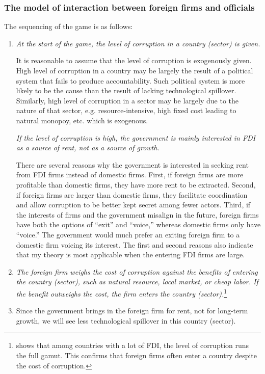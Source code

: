 \subsubsection{The model of interaction between foreign firms and officials}

The sequencing of the game is as follows:
\begin{enumerate}
\item \textit{At the start of the game, the level of corruption in a country (sector) is given.}

It is reasonable to assume that the level of corruption is exogenously given. High level of corruption in a country may be largely the result of a political system that fails to produce accountability. Such political system is more likely to be the cause than the result of lacking technological spillover. Similarly, high level of corruption in a sector may be largely due to the nature of that sector, e.g. resource-intensive, high fixed cost leading to natural monopoy, etc. which is exogenous.

\textit{If the level of corruption is high, the government is mainly interested in FDI as a source of rent, not as a source of growth.}

 There are several reasons why the government is interested in seeking rent from FDI firms instead of domestic firms. First, if foreign firms are more profitable than domestic firms, they have more rent to be extracted. Second, if foreign firms are larger than domestic firms, they facilitate coordination and allow corruption to be better kept secret among fewer actors. Third, if the interests of firms and the government misalign in the future, foreign firms have both the options of ``exit'' and ``voice,'' whereas domestic firms only have ``voice.'' The government would much prefer an exiting foreign firm to a domestic firm voicing its interest. The first and second reasons also indicate that my theory is most applicable when the entering FDI firms are large.
 
\item \textit{The foreign firm weighs the cost of corruption against the benefits of entering the country (sector), such as natural resource, local market, or cheap labor. If the benefit outweighs the cost, the firm enters the country (sector).}\footnote{ shows that among countries with a lot of FDI, the level of corruption runs the full gamut. This confirms that foreign firms often enter a country despite the cost of corruption.}
\item Since the government brings in the foreign firm for rent, not for long-term growth, we will see less technological spillover in this country (sector).
\end{enumerate}

